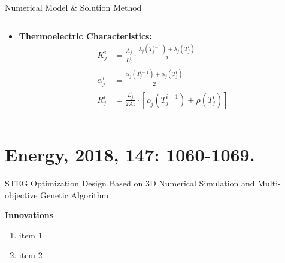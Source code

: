 \documentclass{beamer}
\begin{document}
\begin{frame}{Numerical Model \& Solution Method}
\begin{columns}
\begin{column}{.7\textwidth}
\begin{itemize}
                \item \textbf{Thermoelectric Characteristics:}
                {\small
                \begin{align}
                    K_j^i &= \frac{A_j}{L_j^i} \cdot \frac{\lambda_j\left(T_j^{i-1}\right) + \lambda_j\left(T_j^i\right)}{2} \\[5pt]
                    \alpha_j^i &= \frac{\alpha_j\left(T_j^{i-1}\right) + \alpha_j\left(T_j^i\right)}{2} \\[5pt]
                    R_j^i &= \frac{L_j^i}{2A_j} \cdot \left[\rho_j\left(T_j^{i-1}\right) + \rho\left(T_j^i\right)\right]
                \end{align}
                }
            
            \end{itemize}
        \end{column}
    \end{columns}
\end{frame}


\section{Energy, 2018, 147: 1060-1069.}

\begin{frame}{STEG Optimization Design Based on 3D Numerical Simulation and Multi-objective Genetic Algorithm}
    \begin{block}{\textbf{Innovations}}
        \begin{enumerate}
            \item item 1
            \item item 2
        \end{enumerate}   
    \end{block}
\end{frame}
\end{document}
